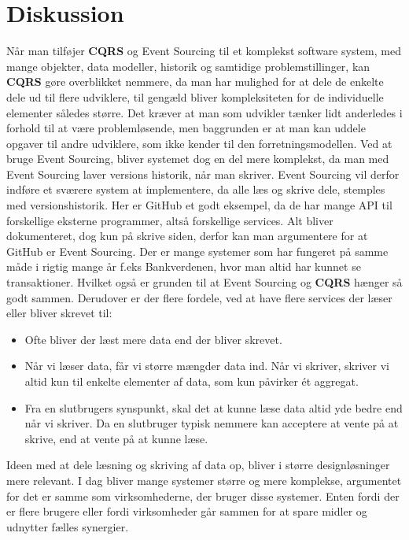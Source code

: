 \chapter{Diskussion}
Når man tilføjer \textbf{CQRS} og Event Sourcing til et komplekst software system, med mange objekter, data modeller, historik og samtidige problemstillinger, kan \textbf{CQRS} gøre overblikket nemmere, da man har mulighed for at dele de enkelte dele ud til flere udviklere, til gengæld bliver kompleksiteten for de individuelle elementer således større.
Det kræver at man som udvikler tænker lidt anderledes i forhold til at være problemløsende, men baggrunden er at man kan uddele opgaver til andre udviklere, som ikke kender til den forretningsmodellen.
Ved at bruge Event Sourcing, bliver systemet dog en del mere komplekst, da man med Event Sourcing laver versions historik, når man skriver. Event Sourcing vil derfor indføre et sværere system at implementere, da alle læs og skrive dele, stemples med versionshistorik. Her er GitHub et godt eksempel, da de har mange API til forskellige eksterne programmer, altså forskellige services. Alt bliver dokumenteret, dog kun på skrive siden, derfor kan man argumentere for at GitHub er Event Sourcing.
Der er mange systemer som har fungeret på samme måde i rigtig mange år f.eks Bankverdenen, hvor man altid har kunnet se transaktioner.
Hvilket også er grunden til at Event Sourcing og \textbf{CQRS} hænger så godt sammen.
\newline
Derudover er der flere fordele, ved at have flere services der læser eller bliver skrevet til:
\begin{itemize}
    \item Ofte bliver der læst mere data end der bliver skrevet.
    \item Når vi læser data, får vi større mængder data ind. Når vi skriver, skriver vi altid kun til enkelte elementer af data, som kun påvirker ét aggregat.
    \item Fra en slutbrugers synspunkt, skal det at kunne læse data altid yde bedre end når vi skriver. Da en slutbruger typisk nemmere kan acceptere at vente på at skrive, end at vente på at kunne læse.
\end{itemize}
\newline
Ideen med at dele læsning og skriving af data op, bliver i større designløsninger mere relevant. 
I dag bliver mange systemer større og mere komplekse, argumentet for det er samme som virksomhederne, der bruger disse systemer. Enten fordi der er flere brugere eller fordi virksomheder går sammen for at spare midler og udnytter fælles synergier.
